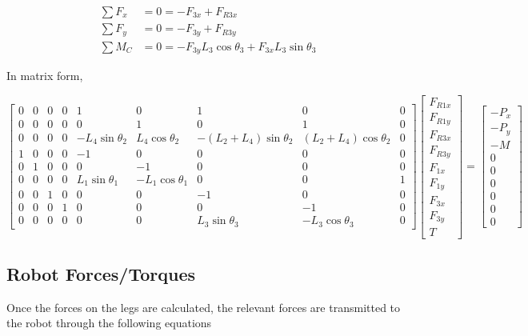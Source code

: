 \documentclass[letterpaper]{article}
\begin{document}
\begin{align}
	\sum F_x &= 0 = -F_{3x} + F_{R3x} \\
	\sum F_y &= 0 = -F_{3y} + F_{R3y} \\
	\sum M_C &= 0 = - F_{3y} L_3 \cos \theta_3 + F_{3x} L_3 \sin \theta_3
\end{align}

\noindent In matrix form,

\begin{equation}
\begin{bmatrix}
0 & 0 & 0 & 0 & 1 & 0 & 1 & 0 &0 \\ 
0 & 0 & 0 & 0 & 0 & 1 & 0 & 1 &0 \\
0 & 0 & 0 & 0 &  -L_4 \sin \theta_2 &  L_4 \cos \theta_2& -(L_2 + L_4) \sin \theta_2 & (L_2 + L_4) \cos \theta_2 & 0 \\
1 & 0 & 0 & 0 & -1 & 0 & 0 & 0 & 0 \\
0 & 1 & 0 & 0 & 0 & -1 & 0 & 0 & 0 \\
0 & 0 & 0 & 0 & L_1 \sin \theta_1 & -L_1 \cos \theta_1 & 0 & 0 & 1\\
0 & 0 & 1 & 0 & 0 & 0 & -1 & 0 & 0 \\
0 & 0 & 0 & 1 & 0 & 0 & 0 & -1 & 0 \\
0 & 0 & 0 & 0 & 0 & 0 & L_3 \sin \theta_3 & -L_3 \cos \theta_3 & 0
\end{bmatrix}
\begin{bmatrix} F_{R1x} \\ F_{R1y} \\ F_{R3x} \\ F_{R3y} \\ F_{1x} \\ F_{1y} \\ F_{3x} \\ F_{3y} \\ T \end{bmatrix}
=
\begin{bmatrix} -P_x \\ - P_y \\ -M \\ 0 \\ 0 \\ 0 \\ 0 \\ 0 \\ 0 \end{bmatrix}
\end{equation}

\subsection{Robot Forces/Torques}
Once the forces on the legs are calculated, the relevant forces are transmitted to the robot through the following equations
\end{document}
